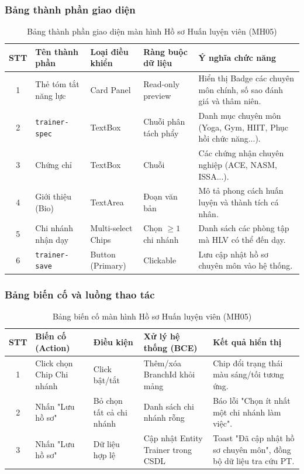 \documentclass[12pt,a4paper]{report}
\begin{document}
\subsubsection{Bảng thành phần giao diện}
\begin{table}[H]
\centering
\small
\begin{tabularx}{\textwidth}{|c|l|l|l|X|}
\hline
\textbf{STT} & \textbf{Tên thành phần} & \textbf{Loại điều khiển} & \textbf{Ràng buộc dữ liệu} & \textbf{Ý nghĩa chức năng} \\ \hline
1 & Thẻ tóm tắt năng lực & Card Panel & Read-only preview & Hiển thị Badge các chuyên môn chính, số sao đánh giá và thâm niên. \\ \hline
2 & \texttt{trainer-spec} & TextBox & Chuỗi phân tách phẩy & Danh mục chuyên môn (Yoga, Gym, HIIT, Phục hồi chức năng...). \\ \hline
3 & Chứng chỉ & TextBox & Chuỗi & Các chứng nhận chuyên nghiệp (ACE, NASM, ISSA...). \\ \hline
4 & Giới thiệu (Bio) & TextArea & Đoạn văn bản & Mô tả phong cách huấn luyện và thành tích cá nhân. \\ \hline
5 & Chi nhánh nhận dạy & Multi-select Chips & Chọn $\ge 1$ chi nhánh & Danh sách các phòng tập mà HLV có thể đến dạy. \\ \hline
6 & \texttt{trainer-save} & Button (Primary) & Clickable & Lưu cập nhật hồ sơ chuyên môn vào hệ thống. \\ \hline
\end{tabularx}
\caption{Bảng thành phần giao diện màn hình Hồ sơ Huấn luyện viên (MH05)}
\end{table}

\subsubsection{Bảng biến cố và luồng thao tác}
\begin{table}[H]
\centering
\small
\begin{tabularx}{\textwidth}{|c|l|l|X|X|}
\hline
\textbf{STT} & \textbf{Biến cố (Action)} & \textbf{Điều kiện} & \textbf{Xử lý hệ thống (BCE)} & \textbf{Kết quả hiển thị} \\ \hline
1 & Click chọn Chip Chi nhánh & Click bật/tắt & Thêm/xóa BranchId khỏi mảng & Chip đổi trạng thái màu sáng/tối tương ứng. \\ \hline
2 & Nhấn "Lưu hồ sơ" & Bỏ chọn tất cả chi nhánh & Danh sách chi nhánh rỗng & Báo lỗi "Chọn ít nhất một chi nhánh làm việc". \\ \hline
3 & Nhấn "Lưu hồ sơ" & Dữ liệu hợp lệ & Cập nhật Entity Trainer trong CSDL & Toast "Đã cập nhật hồ sơ chuyên môn", đồng bộ dữ liệu tra cứu PT. \\ \hline
\end{tabularx}
\caption{Bảng biến cố màn hình Hồ sơ Huấn luyện viên (MH05)}
\end{table}
\end{document}
